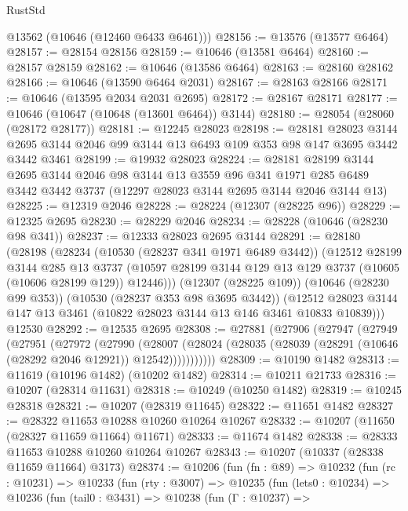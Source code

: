 \begin{lexlean}{RustStd}
\begin{coremodule}
      @13562
      (@10646 (@12460 @6433 @6461)))
@28156 := @13576 (@13577 @6464)
@28157 := @28154 @28156
@28159 := @10646 (@13581 @6464)
@28160 := @28157 @28159
@28162 := @10646 (@13586 @6464)
@28163 := @28160 @28162
@28166 := @10646 (@13590 @6464 @2031)
@28167 := @28163 @28166
@28171 := @10646 (@13595 @2034 @2031 @2695)
@28172 := @28167 @28171
@28177 := @10646 (@10647 (@10648 (@13601 @6464)) @3144)
@28180 := @28054 (@28060 (@28172 @28177))
@28181 := @12245 @28023
@28198 := @28181
    @28023
    @3144
    @2695
    @3144
    @2046
    @99
    @3144
    @13
    @6493
    @109
    @353
    @98
    @147
    @3695
    @3442
    @3442
    @3461
@28199 := @19932 @28023
@28224 := @28181
    @28199
    @3144
    @2695
    @3144
    @2046
    @98
    @3144
    @13
    @3559
    @96
    @341
    @1971
    @285
    @6489
    @3442
    @3442
    @3737
    (@12297 @28023 @3144 @2695 @3144 @2046 @3144 @13)
@28225 := @12319 @2046
@28228 := @28224 (@12307 (@28225 @96))
@28229 := @12325 @2695
@28230 := @28229 @2046
@28234 := @28228 (@10646 (@28230 @98 @341))
@28237 := @12333 @28023 @2695 @3144
@28291 := @28180
    (@28198
      (@28234
        (@10530 (@28237 @341 @1971 @6489 @3442))
        (@12512
          @28199
          @3144
          @285
          @13
          @3737
          (@10597 @28199 @3144 @129 @13 @129 @3737 (@10605 (@10606 @28199 @129)) @12446)))
      (@12307 (@28225 @109))
      (@10646 (@28230 @99 @353))
      (@10530 (@28237 @353 @98 @3695 @3442))
      (@12512 @28023 @3144 @147 @13 @3461 (@10822 @28023 @3144 @13 @146 @3461 @10833 @10839)))
    @12530
@28292 := @12535 @2695
@28308 := @27881
    (@27906
      (@27947
        (@27949
          (@27951
            (@27972
              (@27990
                (@28007
                  (@28024 (@28035 (@28039 (@28291 (@10646 (@28292 @2046 @12921)) @12542)))))))))))
@28309 := @10190 @1482
@28313 := @11619 (@10196 @1482) (@10202 @1482)
@28314 := @10211 @21733
@28316 := @10207 (@28314 @11631)
@28318 := @10249 (@10250 @1482)
@28319 := @10245 @28318
@28321 := @10207 (@28319 @11645)
@28322 := @11651 @1482
@28327 := @28322 @11653 @10288 @10260 @10264 @10267
@28332 := @10207 (@11650 (@28327 @11659 @11664) @11671)
@28333 := @11674 @1482
@28338 := @28333 @11653 @10288 @10260 @10264 @10267
@28343 := @10207 (@10337 (@28338 @11659 @11664) @3173)
@28374 := @10206
    (fun (fn : @89) =>
    @10232
      (fun (rc : @10231) =>
      @10233
        (fun (rty : @3007) =>
        @10235
          (fun (lets0 : @10234) =>
          @10236
            (fun (tail0 : @3431) =>
            @10238
              (fun (Γ : @10237) =>

\end{coremodule}
\end{lexlean}
